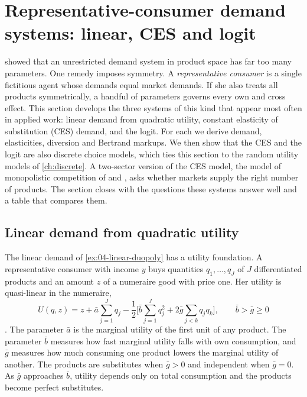 \section{Representative-consumer demand systems: linear, CES and logit}\label{sec:04-repcons}

 showed that an unrestricted demand system in product space has far too many parameters.
One remedy imposes symmetry. A \emph{representative consumer} is a single fictitious agent whose demands equal
market demands. If she also treats all products symmetrically, a handful of parameters governs every own and
cross effect. This section develops the three systems of this kind that appear most often in applied work:
linear demand from quadratic utility, constant elasticity of substitution (CES) demand, and the logit. For each
we derive demand, elasticities, diversion and Bertrand markups. We then show that the CES and the logit are also
discrete choice models, which ties this section to the random utility models of \cref{ch:discrete}. A two-sector
version of the CES model, the model of monopolistic competition of \citet{Spence1976} and \citet{DixitStiglitz1977},
asks whether markets supply the right number of products. The section closes with the questions these systems answer
well and a table that compares them.

\subsection{Linear demand from quadratic utility}\label{sec:04-repcons-linear}

The linear demand of \cref{ex:04-linear-duopoly} has a utility foundation. A representative consumer with
income $y$ buys quantities $q_1, \dots, q_J$ of $J$ differentiated products and an amount $z$ of a numeraire good
with price one. Her utility is quasi-linear in the numeraire,
\begin{equation}\label{eq:04-quadratic-utility}
U(q, z) = z + \bar a\sum_{j=1}^J q_j - \frac{1}{2}\Big[\bar b\sum_{j=1}^J q_j^2 + 2\bar g\sum_{j<k}q_jq_k\Big],
\qquad \bar b > \bar g \ge 0
\end{equation}
\citep{SinghVives1984,Vives1999}. The parameter $\bar a$ is the marginal utility of the first unit of any
product. The parameter $\bar b$ measures how fast marginal utility falls with own consumption, and $\bar g$
measures how much consuming one product lowers the marginal utility of another. The products are substitutes
when $\bar g > 0$ and independent when $\bar g = 0$. As $\bar g$ approaches $\bar b$, utility depends only on total
consumption and the products become perfect substitutes.

